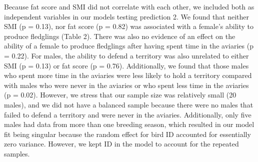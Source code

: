 \documentclass[
]{article}
\newenvironment{Shaded}{\begin{snugshade}}{\end{snugshade}}
\newcommand{\CommentTok}[1]{\textcolor[rgb]{0.56,0.35,0.01}{\textit{#1}}}
\newcommand{\DataTypeTok}[1]{\textcolor[rgb]{0.13,0.29,0.53}{#1}}
\newcommand{\DecValTok}[1]{\textcolor[rgb]{0.00,0.00,0.81}{#1}}
\newcommand{\KeywordTok}[1]{\textcolor[rgb]{0.13,0.29,0.53}{\textbf{#1}}}
\newcommand{\NormalTok}[1]{#1}
\newcommand{\OperatorTok}[1]{\textcolor[rgb]{0.81,0.36,0.00}{\textbf{#1}}}
\newcommand{\StringTok}[1]{\textcolor[rgb]{0.31,0.60,0.02}{#1}}
\begin{document}
Because fat score and SMI did not correlate with each other, we included
both as independent variables in our models testing prediction 2. We
found that neither SMI (p = 0.13), nor fat score (p = 0.82) was
associated with a female's ability to produce fledglings (Table 2).
There was also no evidence of an effect on the ability of a female to
produce fledglings after having spent time in the aviaries (p = 0.22).
For males, the ability to defend a territory was also unrelated to
either SMI (p = 0.13) or fat score (p = 0.76). Additionally, we found
that those males who spent more time in the aviaries were less likely to
hold a territory compared with males who were never in the aviaries or
who spent less time in the aviaries (p = 0.02). However, we stress that
our sample size was relatively small (20 males), and we did not have a
balanced sample because there were no males that failed to defend a
territory and were never in the aviaries. Additionally, only five males
had data from more than one breeding season, which resulted in our model
fit being singular because the random effect for bird ID accounted for
essentially zero variance. However, we kept ID in the model to account
for the repeated samples.

\begin{Shaded}
\end{Shaded}
\end{document}
